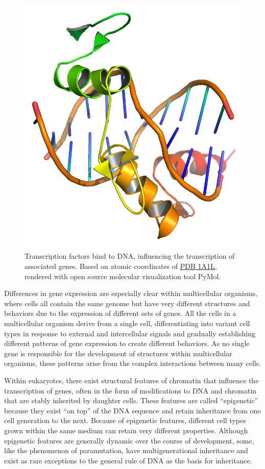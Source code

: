 \begin{figure}

{\centering \includegraphics[width=0.7\linewidth]{./figures/genetics/Transcription_factor_DNA_1A1L} 

}

\caption{Transcription factors bind to DNA, influencing the transcription of associated genes. Based on atomic coordinates of \href{https://www.rcsb.org/structure/1a1l}{PDB 1A1L}, rendered with open source molecular visualization tool PyMol.}\label{fig:transcriptionfactor}
\end{figure}

Differences in gene expression are especially clear within multicellular organisms, where cells all contain the same genome but have very different structures and behaviors due to the expression of different sets of genes. All the cells in a multicellular organism derive from a single cell, differentiating into variant cell types in response to external and intercellular signals and gradually establishing different patterns of gene expression to create different behaviors. As no single gene is responsible for the development of structures within multicellular organisms, these patterns arise from the complex interactions between many cells.

Within eukaryotes, there exist structural features of chromatin that influence the transcription of genes, often in the form of modifications to DNA and chromatin that are stably inherited by daughter cells. These features are called ``epigenetic'' because they exist ``on top'' of the DNA sequence and retain inheritance from one cell generation to the next. Because of epigenetic features, different cell types grown within the same medium can retain very different properties. Although epigenetic features are generally dynamic over the course of development, some, like the phenomenon of paramutation, have multigenerational inheritance and exist as rare exceptions to the general rule of DNA as the basis for inheritance.

